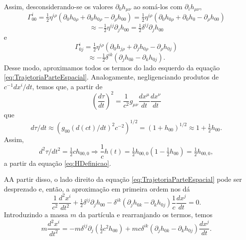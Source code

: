 Assim, desconsiderando-se os valores $ \partial_{0} h_{\mu \nu} $ ao somá-los com $ \partial_{i} h_{\mu \nu} $,
\[
\Gamma_{00}^{i}=\tfrac{1}{2} \eta^{i \rho}\left(\partial_{0} h_{0 \rho}+\partial_{0} h_{0 \rho}-\partial_{\rho} h_{00}\right) = 
\tfrac{1}{2} \eta^{i \rho}\left(\partial_{0} h_{0 \rho}+\partial_{0} h_{0 }-\partial_{\rho} h_{00}\right)
\]
\[
\approx -\tfrac{1}{2} \eta^{i j} \partial_{j} h_{00}=\tfrac{1}{2} \delta^{i j} \partial_{j} h_{00}
\]
e
\[
\Gamma_{0 j}^{i}=\tfrac{1}{2} \eta^{i \rho}\left(\partial_{0} h_{j \rho}+\partial_{j} h_{0 \rho}-\partial_{\rho} h_{0 j}\right)
\]
\[
\approx -\tfrac{1}{2} \delta^{i k}\left(\partial_{j} h_{0 k}-\partial_{k} h_{0 j}\right) .
\]
Desse modo, aproximamos todos os termos do lado esquerdo da equação \eqref{eq:TrajetoriaParteEspacial}. Analogamente, negligenciando produtos de $ c^{-1} d x^{i} / d t $, temos que, a partir de
\[
\left(\frac{d \tau}{d t}\right)^{2}=\frac{1}{c^{2}} g_{\mu \nu} \frac{d x^{\mu}}{d t} \frac{d x^{\nu}}{d t}
\]
que
\[
d \tau / d t\approx \left(g_{00}\left({d(ct)}/dt\right)^2c^{-2}\right)^{1/2} = \left(1+h_{00}\right)^{1 / 2}\approx 1+\tfrac{1}{2} h_{00} .
\]
Assim,
\[
d^{2} \tau / d t^{2}=\tfrac{1}{2} c h_{00,0} \Rightarrow \frac{1}{c} h(t)=\tfrac{1}{2} h_{00,0}\left(1-\tfrac{1}{2} h_{00}\right)=\tfrac{1}{2} h_{00,0},
\]
a partir da equação \eqref{eq:HDefinicao}. 

AA partir disso, o lado direito da equação \eqref{eq:TrajetoriaParteEspacial} pode ser desprezado e, então, a aproximação em primeira ordem nos dá
\[
\frac{1}{c^{2}} \frac{d^{2} x^{i}}{d t^{2}}+\tfrac{1}{2} \delta^{i j} \partial_{j} h_{00}-\delta^{i k}\left(\partial_{j} h_{0 k}-\partial_{k} h_{0 j}\right) \frac{1}{c} \frac{d x^{j}}{d t}=0 .
\]
Introduzindo a massa $ m $ da partícula e rearranjando os termos, temos
\begin{equation}\label{eq:TrajetoriaParticulaComMassa}
m \frac{d^{2} x^{i}}{d t^{2}}=-m \delta^{i j} \partial_{j}\left(\tfrac{1}{2} c^{2} h_{00}\right)+m c \delta^{i k}\left(\partial_{j} h_{0 k}-\partial_{k} h_{0 j}\right) \frac{d x^{j}}{d t} .
\end{equation}

